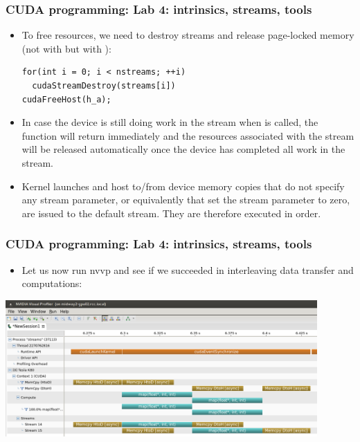 \begin{frame}[fragile]
  \frametitle{CUDA programming: Lab 4: intrinsics, streams, tools}
\begin{itemize}
\item To free resources, we need to destroy streams and release page-locked memory (not with  but with ):
{\color{mycolorcode}
\begin{verbatim}
for(int i = 0; i < nstreams; ++i)
  cudaStreamDestroy(streams[i])
cudaFreeHost(h_a);
\end{verbatim}
}
\item In case the device is still doing work in the stream when  is
called, the function will return immediately and the resources associated with the stream
will be released automatically once the device has completed all work in the stream.
\item Kernel launches and host to/from device memory copies that do not specify any stream
parameter, or equivalently that set the stream parameter to zero, are issued to the default
stream. They are therefore executed in order.
\end{itemize}
\end{frame}


\begin{frame}[fragile]
  \frametitle{CUDA programming: Lab 4: intrinsics, streams, tools}
\begin{itemize}
\item Let us now run nvvp and see if we succeeded in interleaving data transfer and computations:
\end{itemize}
\includegraphics[width=11.9cm]{graphs/streams.png}
\end{frame}

